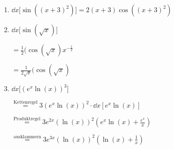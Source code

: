 \item
\begin{enumerate}

\item $\dd{}{x} \lbrack \sin((x+3)^2) \rbrack = 2(x+3)\cos((x+3)^2)$

\item

$\dd{}{x} \lbrack \sin(\sqrt x) \rbrack$

$=\frac{1}{2}(\cos(\sqrt x)x^{-\frac{1}{2}}$

$=\frac{1}{2\sqrt{x}}(\cos(\sqrt x)$

\item

$\dd{}{x} \lbrack (e^x \ln(x))^3 \rbrack $

$\stackrel{\text{Kettenregel}}{=} 3(e^x\ln(x))^2 \cdot \dd{}{x}[e^x\ln(x)]$

$\stackrel{\text{Produktregel}}{=} 3e^{2x}(\ln(x))^2(e^x\ln(x)+\frac{e^x}{x})$

$\stackrel{\text{ausklammern}}{=} 3e^{3x}(\ln(x))^2(\ln(x)+\frac{1}{x})$
\end{enumerate}

